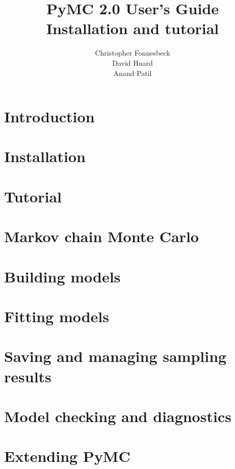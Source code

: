 \documentclass[]{manual}
\title{PyMC 2.0 User's Guide \\
Installation and tutorial}
\author{ Christopher Fonnesbeck\\ David Huard \\ Anand Patil }
\begin{document}
\maketitle

\tableofcontents
\linenumbers
\chapter{Introduction} 
\label{chap:intro} 


\chapter{Installation} 
\label{chap:install} 


\chapter{Tutorial}
\label{chap:tutorial}


\chapter{Markov chain Monte Carlo} 
\label{chap:MCMC} 


\chapter{Building models}
\label{chap:modelbuilding} 


\chapter{Fitting models}
\label{chap:modelfitting}


\chapter{Saving and managing sampling results}
\label{chap:database} 


\chapter{Model checking and diagnostics} 
\label{chap:modelchecking}


\chapter{Extending PyMC}
\label{chap:extending}

\end{document}

